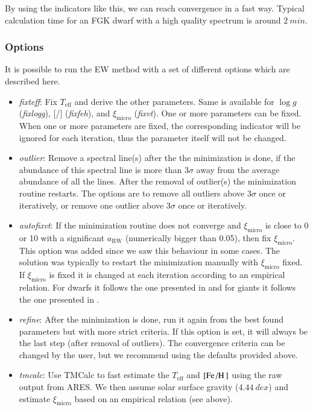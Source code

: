 \documentclass{aa}
\begin{document}
By using the indicators like this, we can reach convergence in a fast way.
Typical calculation time for an FGK dwarf with a high quality spectrum is around
$\SI{2}{min}$.

\subsubsection{Options}
\label{subs:EWoptions}
It is possible to run the EW method with a set of different options which
are described here.

\begin{itemize}
    \item \emph{fixteff}: Fix $T_\mathrm{eff}$ and derive the other parameters.
          Same is available for $\log g$ (\emph{fixlogg}), [/]
          (\emph{fixfeh}), and $\xi_\mathrm{micro}$ (\emph{fixvt}). One or more
          parameters can be fixed. When one or more parameters are fixed, the
          corresponding indicator will be ignored for each iteration, thus the
          parameter itself will not be changed.
    \item \emph{outlier}: Remove a spectral line(s) after the the minimization
          is done, if the abundance of this spectral line is more than $3\sigma$
          away from the average abundance of all the lines. After the removal
          of outlier(s) the minimization routine restarts. The options are to
          remove all outliers above $3\sigma$ once or iteratively, or remove one
          outlier above $3\sigma$ once or iteratively.
    \item \emph{autofixvt}: If the minimization routine does not converge and
          $\xi_\mathrm{micro}$ is close to 0 or 10 with a significant
          $a_\mathrm{RW}$ (numerically bigger than 0.05), then fix
          $\xi_\mathrm{micro}$. This option was added since we saw this
          behaviour in some cases. The solution was typically to restart the
          minimization manually with $\xi_\mathrm{micro}$ fixed. If
          $\xi_\mathrm{micro}$ is fixed it is changed at each iteration
          according to an empirical relation. For dwarfs it follows the one
          presented in \citet{Tsantaki2013} and for giants it follows the one
          presented in \citet{Adibekyan2015}.
    \item \emph{refine}: After the minimization is done, run it again from the best
          found parameters but with more strict criteria. If this option is set,
          it will always be the last step (after removal of outliers). The
          convergence criteria can be changed by the user, but we recommend
          using the defaults provided above.
    \item \emph{tmcalc}: Use TMCalc \citep{Sousa2012} to fast estimate the
          $T_\mathrm{eff}$ and $[\ion{Fe}/\ion{H}]$ using the raw output from
          ARES. We then assume solar surface gravity ($\SI{4.44}{dex}$) and
          estimate $\xi_\mathrm{micro}$ based on an empirical relation (see above).
\end{itemize}
\end{document}
